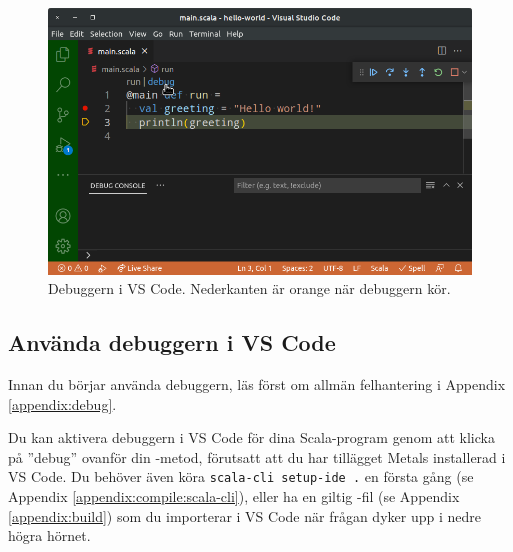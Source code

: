\begin{figure}
\centering
\includegraphics[width=1.0\textwidth]{../img/vscode-debug}
\caption{Debuggern i VS Code. Nederkanten är orange när debuggern kör. \label{appendix-ide:vscode-debug}}
\end{figure}

\subsection{Använda debuggern i VS Code}

Innan du börjar använda debuggern, läs först om allmän felhantering i Appendix \ref{appendix:debug}.

Du kan aktivera debuggern i VS Code för dina Scala-program genom att klicka på ''debug'' ovanför din -metod, förutsatt att du har tillägget Metals installerad i VS Code. Du behöver även köra \texttt{scala-cli setup-ide .} en första gång (se Appendix \ref{appendix:compile:scala-cli}), eller ha en giltig -fil (se Appendix \ref{appendix:build}) som du importerar i VS Code när frågan dyker upp i nedre högra hörnet. 

